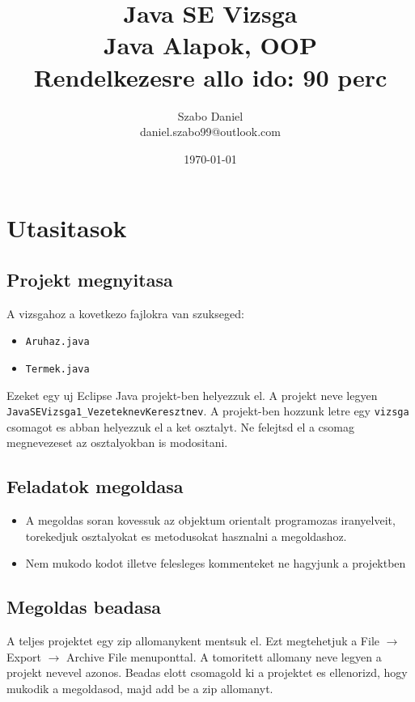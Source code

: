 \documentclass{article}
\title{%
Java SE Vizsga\\
\large Java Alapok, OOP\\
\large Rendelkezesre allo ido: 90 perc}
\author{Szabo Daniel\\daniel.szabo99@outlook.com}
\date{\today}
\begin{document}
\maketitle

\section{Utasitasok}

\subsection{Projekt megnyitasa}

A vizsgahoz a kovetkezo fajlokra van szukseged:
\begin{itemize}
    \item \lstinline{Aruhaz.java}
    \item \lstinline{Termek.java}
\end{itemize}
Ezeket egy uj Eclipse Java projekt-ben helyezzuk el. A projekt neve legyen \lstinline{JavaSEVizsga1_VezeteknevKeresztnev}. A projekt-ben hozzunk letre egy \lstinline{vizsga} csomagot es abban helyezzuk el a ket osztalyt. Ne felejtsd el a csomag megnevezeset az osztalyokban is modositani.

\subsection{Feladatok megoldasa}

\begin{itemize}
    \item A megoldas soran kovessuk az objektum orientalt programozas iranyelveit, torekedjuk osztalyokat es metodusokat hasznalni a megoldashoz.
    \item Nem mukodo kodot illetve felesleges kommenteket ne hagyjunk a projektben
\end{itemize}

\subsection{Megoldas beadasa}

A teljes projektet egy zip allomanykent mentsuk el. Ezt megtehetjuk a File $\rightarrow$ Export $\rightarrow$ Archive File menuponttal. A tomoritett allomany neve legyen a projekt nevevel azonos. Beadas elott csomagold ki a projektet es ellenorizd, hogy mukodik a megoldasod, majd add be a zip allomanyt.

\newpage
\end{document}
